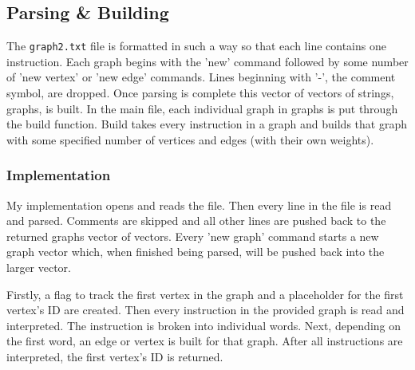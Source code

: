 \documentclass[12pt, letterpaper]{article}
\begin{document}
\subsection{Parsing \& Building} \label{Graph_ParseBuild}
The \texttt{graph2.txt} file is formatted in such a way so that each line contains one instruction.
Each graph begins with the 'new' command followed by some number of 'new vertex' or 'new edge' commands.
Lines beginning with '-', the comment symbol, are dropped.
\vspace*{5px}
\newline
Once parsing is complete this vector of vectors of strings, graphs, is built.
In the main file, each individual graph in graphs is put through the build function.
Build takes every instruction in a graph and builds that graph with some specified number of vertices and edges (with their own weights).

\subsubsection{Implementation}
\begin{center}
   
\end{center}
My implementation opens and reads the file.
Then every line in the file is read and parsed.
Comments are skipped and all other lines are pushed back to the returned graphs vector of vectors.
Every 'new graph' command starts a new graph vector which, when finished being parsed, will be pushed back into the larger vector.
\begin{center}
   
\end{center}
Firstly, a flag to track the first vertex in the graph and a placeholder for the first vertex's ID are created.
Then every instruction in the provided graph is read and interpreted.
The instruction is broken into individual words.
Next, depending on the first word, an edge or vertex is built for that graph.
After all instructions are interpreted, the first vertex's ID is returned.
\end{document}
